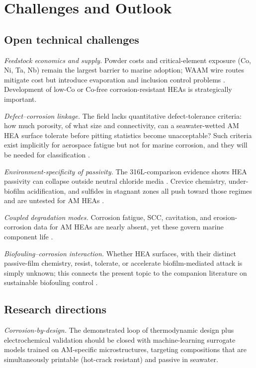 \section{Challenges and Outlook}
\label{sec:challenges}

\subsection{Open technical challenges}

\emph{Feedstock economics and supply.} Powder costs and critical-element exposure (Co, Ni, Ta, Nb) remain the largest barrier to marine adoption; WAAM wire routes mitigate cost but introduce evaporation and inclusion control problems \cite{cagirici2024,andersson2026waam}. Development of low-Co or Co-free corrosion-resistant HEAs is strategically important.

\emph{Defect--corrosion linkage.} The field lacks quantitative defect-tolerance criteria: how much porosity, of what size and connectivity, can a seawater-wetted AM HEA surface tolerate before pitting statistics become unacceptable? Such criteria exist implicitly for aerospace fatigue but not for marine corrosion, and they will be needed for classification \cite{dnvstb203}.

\emph{Environment-specificity of passivity.} The 316L-comparison evidence shows HEA passivity can collapse outside neutral chloride media \cite{lpbf_cantor_2024}. Crevice chemistry, under-biofilm acidification, and sulfides in stagnant zones all push toward those regimes and are untested for AM HEAs \cite{qiu2017}.

\emph{Coupled degradation modes.} Corrosion fatigue, SCC, cavitation, and erosion-corrosion data for AM HEAs are nearly absent, yet these govern marine component life \cite{lpbf_316l_scc2022}.

\emph{Biofouling--corrosion interaction.} Whether HEA surfaces, with their distinct passive-film chemistry, resist, tolerate, or accelerate biofilm-mediated attack is simply unknown; this connects the present topic to the companion literature on sustainable biofouling control \cite{nass2025marine}.

\subsection{Research directions}

\emph{Corrosion-by-design.} The demonstrated loop of thermodynamic design plus electrochemical validation \cite{lu2018design,quiambao2019} should be closed with machine-learning surrogate models trained on AM-specific microstructures, targeting compositions that are simultaneously printable (hot-crack resistant) and passive in seawater.

